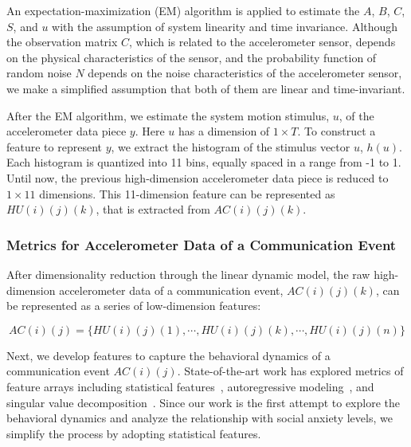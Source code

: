 An expectation-maximization (EM) algorithm is applied to estimate the $A$, $B$, $C$, $S$, and $u$ with the assumption of system linearity and time invariance. Although the observation matrix $C$, which is related to the accelerometer sensor, depends on the physical characteristics of the sensor, and the probability function of random noise $N$ depends on the noise characteristics of the accelerometer sensor, we make a simplified assumption that both of them are linear and time-invariant.

After the EM algorithm, we estimate the system motion stimulus, $u$, of the accelerometer data piece $y$. Here $u$ has a dimension of $1 \times T$. To construct a feature to represent $y$, we extract the histogram of the stimulus vector $u$, $h(u)$. Each histogram is quantized into 11 bins, equally spaced in a range from -1 to 1. Until now, the previous high-dimension accelerometer data piece is reduced to $1\times 11$ dimensions. This 11-dimension feature can be represented as $HU(i)(j)(k)$, that is extracted from $AC(i)(j)(k)$.

\subsubsection{Metrics for Accelerometer Data of a Communication Event} %

After dimensionality reduction through the linear dynamic model, the raw high-dimension accelerometer data of a communication event, $AC(i)(j)(k)$, can be represented as a series of low-dimension features:

\begin{equation}
\label{HU series}
AC(i)(j)=\{HU(i)(j)(1),\cdots, HU(i)(j)(k), \cdots, HU(i)(j)(n)\}
\end{equation}

Next, we develop features to capture the behavioral dynamics of a communication event $AC(i)(j)$. State-of-the-art work has explored metrics of feature arrays including statistical features~\cite{bishop2006pattern}, autoregressive modeling~\cite{sapankevych2009time}, and singular value decomposition~\cite{liu2013modeling}. Since our work is the first attempt to explore the behavioral dynamics and analyze the relationship with social anxiety levels, we simplify the process by adopting statistical features.

